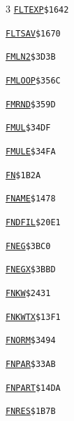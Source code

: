 \begin{multicols}{3}
\noindent\hyperlink{l:FLTEXP}{\texttt{FLTEXP}}\hfill\texttt{\$1642~\phantom{000}\llap{\pageref{l:FLTEXP}}}\par
\noindent\hyperlink{l:FLTSAV}{\texttt{FLTSAV}}\hfill\texttt{\$1670~\phantom{000}\llap{\pageref{l:FLTSAV}}}\par
\noindent\hyperlink{l:FMLN2}{\texttt{FMLN2}}\hfill\texttt{\$3D3B~\phantom{000}\llap{\pageref{l:FMLN2}}}\par
\noindent\hyperlink{l:FMLOOP}{\texttt{FMLOOP}}\hfill\texttt{\$356C~\phantom{000}\llap{\pageref{l:FMLOOP}}}\par
\noindent\hyperlink{l:FMRND}{\texttt{FMRND}}\hfill\texttt{\$359D~\phantom{000}\llap{\pageref{l:FMRND}}}\par
\noindent\hyperlink{l:FMUL}{\texttt{FMUL}}\hfill\texttt{\$34DF~\phantom{000}\llap{\pageref{l:FMUL}}}\par
\noindent\hyperlink{l:FMULE}{\texttt{FMULE}}\hfill\texttt{\$34FA~\phantom{000}\llap{\pageref{l:FMULE}}}\par
\noindent\hyperlink{l:FN}{\texttt{FN}}\hfill\texttt{\$1B2A~\phantom{000}\llap{\pageref{l:FN}}}\par
\noindent\hyperlink{l:FNAME}{\texttt{FNAME}}\hfill\texttt{\$1478~\phantom{000}\llap{\pageref{l:FNAME}}}\par
\noindent\hyperlink{l:FNDFIL}{\texttt{FNDFIL}}\hfill\texttt{\$20E1~\phantom{000}\llap{\pageref{l:FNDFIL}}}\par
\noindent\hyperlink{l:FNEG}{\texttt{FNEG}}\hfill\texttt{\$3BC0~\phantom{000}\llap{\pageref{l:FNEG}}}\par
\noindent\hyperlink{l:FNEGX}{\texttt{FNEGX}}\hfill\texttt{\$3BBD~\phantom{000}\llap{\pageref{l:FNEGX}}}\par
\noindent\hyperlink{l:FNKW}{\texttt{FNKW}}\hfill\texttt{\$2431~\phantom{000}\llap{\pageref{l:FNKW}}}\par
\noindent\hyperlink{l:FNKWTX}{\texttt{FNKWTX}}\hfill\texttt{\$13F1~\phantom{000}\llap{\pageref{l:FNKWTX}}}\par
\noindent\hyperlink{l:FNORM}{\texttt{FNORM}}\hfill\texttt{\$3494~\phantom{000}\llap{\pageref{l:FNORM}}}\par
\noindent\hyperlink{l:FNPAR}{\texttt{FNPAR}}\hfill\texttt{\$33AB~\phantom{000}\llap{\pageref{l:FNPAR}}}\par
\noindent\hyperlink{l:FNPART}{\texttt{FNPART}}\hfill\texttt{\$14DA~\phantom{000}\llap{\pageref{l:FNPART}}}\par
\noindent\hyperlink{l:FNRES}{\texttt{FNRES}}\hfill\texttt{\$1B7B~\phantom{000}\llap{\pageref{l:FNRES}}}\par

\end{multicols}

